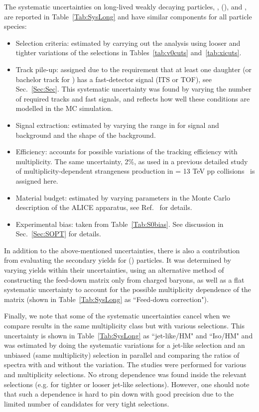 The systematic uncertainties on long-lived weakly decaying particles, \Ks, \LA(\AL), and \XI, are reported in Table~\ref{Tab:SysLong} and have similar components for all particle species:
\begin{itemize}
\item Selection criteria: estimated by carrying out the analysis using looser and tighter variations of the selections in Tables~\ref{tab:v0cuts} and~\ref{tab:xicuts}. 
\item Track pile-up: assigned due to the requirement that at least one daughter (or bachelor track for \XI) has a fast-detector signal (ITS or TOF), see Sec.~\ref{Sec:Sec}. This systematic uncertainty was found by varying the number of required tracks and fast signals, and reflects how well these conditions are modelled in the MC simulation.
\item Signal extraction: estimated by varying the range in \Minv for signal and background and the shape of the background.
\item Efficiency: accounts for possible variations of the tracking
efficiency with multiplicity. The same uncertainty, 2\%, as used in a previous detailed study of multiplicity-dependent strangeness production in \s = 13 TeV pp collisions~\cite{alice_newstrangeness} is assigned here.
\item Material budget: estimated by varying parameters in the Monte Carlo description of the ALICE apparatus, see Ref.~\cite{ALICE2} for details.
\item Experimental bias: taken from Table~\ref{Tab:S0bias}. See discussion in Sec.~\ref{Sec:SOPT} for details.
\end{itemize}

In addition to the above-mentioned uncertainties, there is also a contribution from evaluating the secondary yields for \LA(\AL) particles. It was determined by varying \XI yields within their uncertainties, using an alternative method of constructing the feed-down matrix only from charged \XI baryons, as well as a flat systematic uncertainty to account for the possible multiplicity dependence of the matrix (shown in Table~\ref{Tab:SysLong} as ``Feed-down correction").

Finally, we note that some of the systematic uncertainties cancel when we compare results in the same multiplicity class but with various \SOPT selections. This uncertainty is shown in Table~\ref{Tab:SysLong} as ``jet-like/HM" and ``Iso/HM" and was estimated by doing the systematic variations for a jet-like selection and an unbiased (same multiplicity) selection in parallel and comparing the ratios of \pt spectra with and without the variation. The studies were performed for various \SOPT and multiplicity selections. No strong dependence was found inside the relevant selections (e.g. for tighter or looser jet-like selections). However, one should note that such a dependence is hard to pin down with good precision due to the limited number of candidates for very tight selections. 


